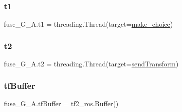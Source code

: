 \subsubsection{\texorpdfstring{t1}{t1}}
{\footnotesize\ttfamily fuse\+\_\+\+G\+\_\+\+A.\+t1 = threading.\+Thread(target=\hyperlink{namespacefuse___g___a_a42c3d8256503837ca1b83810899b7ef1}{make\+\_\+choice})}

\mbox{\label{namespacefuse___g___a_a0687b548a1348e39b486842bcddc00ef}} 
\subsubsection{\texorpdfstring{t2}{t2}}
{\footnotesize\ttfamily fuse\+\_\+\+G\+\_\+\+A.\+t2 = threading.\+Thread(target=\hyperlink{namespacefuse___g___a_a6d74da897ef71d656b91058602147dd2}{send\+Transform})}

\mbox{\label{namespacefuse___g___a_a11d49507fb155a9ee2f990026fd61296}} 
\subsubsection{\texorpdfstring{tf\+Buffer}{tfBuffer}}
{\footnotesize\ttfamily fuse\+\_\+\+G\+\_\+\+A.\+tf\+Buffer = tf2\+\_\+ros.\+Buffer()}

